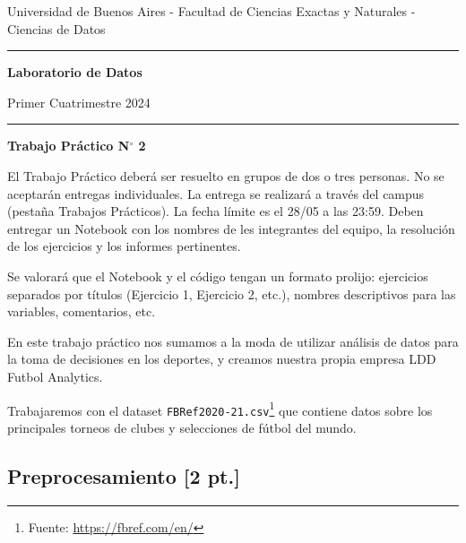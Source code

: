 \documentclass[a4paper,11pt]{article}
\theoremstyle{definition}
\begin{document}
\centerline{{\small Universidad de Buenos Aires - Facultad de Ciencias Exactas y Naturales - Ciencias de Datos}}

\vskip 0.2cm

\hrule

\vskip 0.2cm

 \centerline{{\bf\Large{\sc Laboratorio de Datos}}}

 \vskip 0.2cm

 \centerline{\ttfamily Primer Cuatrimestre 2024}

\vskip 0.2cm

 \hrule

 \bigskip
 \centerline{\bf Trabajo Práctico N$^\circ$ 2}
 \bigskip

El Trabajo Práctico deberá ser resuelto en grupos de dos o tres personas. No se aceptarán entregas individuales. La entrega se realizará a través del campus (pestaña Trabajos Prácticos). La fecha límite es el 28/05 a las 23:59. Deben entregar un Notebook con los nombres de les integrantes del equipo, la resolución de los ejercicios y los informes pertinentes.

Se valorará que el Notebook y el código tengan un formato prolijo: ejercicios separados por títulos (Ejercicio 1, Ejercicio 2, etc.), nombres descriptivos para las variables, comentarios, etc.

\vspace{0.5cm}

En este trabajo práctico nos sumamos a la moda de utilizar an\'alisis de datos para la toma de decisiones en los deportes, y creamos nuestra propia empresa LDD Futbol Analytics.


Trabajaremos con el dataset \verb|FBRef2020-21.csv|\footnote{Fuente: \url{https://fbref.com/en/}} que contiene datos sobre los principales torneos de clubes y selecciones de fútbol del mundo.


\subsection*{Preprocesamiento [2 pt.]}
\end{document}
